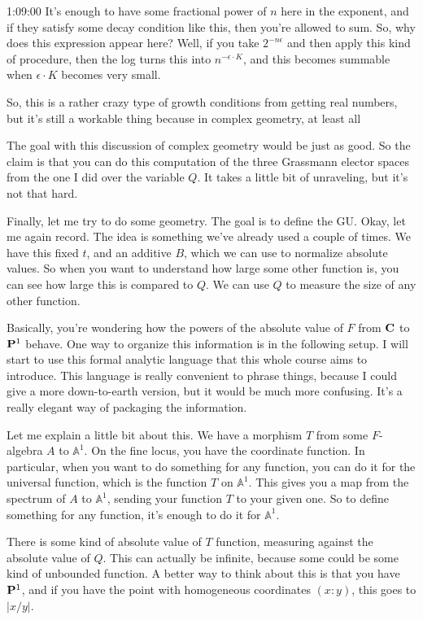 \begin{unfinished}{1:09:00}
It's enough to have some fractional power of $n$ here in the exponent, and if they satisfy some decay condition like this, then you're allowed to sum. So, why does this expression appear here? Well, if you take $2^{-n\epsilon}$ and then apply this kind of procedure, then the log turns this into $n^{-\epsilon\cdot K}$, and this becomes summable when $\epsilon\cdot K$ becomes very small.

So, this is a rather crazy type of growth conditions from getting real numbers, but it's still a workable thing because in complex geometry, at least all

The goal with this discussion of complex geometry would be just as good. So the claim is that you can do this computation of the three Grassmann elector spaces from the one I did over the variable $Q$. It takes a little bit of unraveling, but it's not that hard.

Finally, let me try to do some geometry. The goal is to define the GU. Okay, let me again record. The idea is something we've already used a couple of times. We have this fixed $t$, and an additive $B$, which we can use to normalize absolute values. So when you want to understand how large some other function is, you can see how large this is compared to $Q$. We can use $Q$ to measure the size of any other function.

Basically, you're wondering how the powers of the absolute value of $F$ from $\C$ to $\P^1$ behave. One way to organize this information is in the following setup. I will start to use this formal analytic language that this whole course aims to introduce. This language is really convenient to phrase things, because I could give a more down-to-earth version, but it would be much more confusing. It's a really elegant way of packaging the information.

Let me explain a little bit about this. We have a morphism $T$ from some $F$-algebra $A$ to $\mathbb{A}^1$. On the fine locus, you have the coordinate function. In particular, when you want to do something for any function, you can do it for the universal function, which is the function $T$ on $\mathbb{A}^1$. This gives you a map from the spectrum of $A$ to $\mathbb{A}^1$, sending your function $T$ to your given one. So to define something for any function, it's enough to do it for $\mathbb{A}^1$.

There is some kind of absolute value of $T$ function, measuring against the absolute value of $Q$. This can actually be infinite, because some could be some kind of unbounded function. A better way to think about this is that you have $\P^1$, and if you have the point with homogeneous coordinates $(x:y)$, this goes to $|x/y|$.


\end{unfinished}
